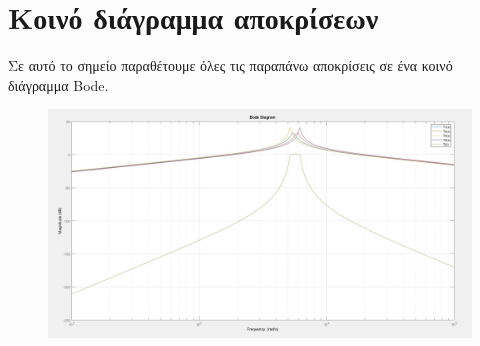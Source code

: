 \documentclass{article}
\begin{document}
{{\section*{Κοινό διάγραμμα αποκρίσεων} 
Σε αυτό το σημείο παραθέτουμε όλες τις παραπάνω αποκρίσεις σε ένα κοινό διάγραμμα Bode.
\begin{figure}[h!]
\centering
 	\advance\leftskip-4cm
  \includegraphics[width=200mm,scale=2]{thema2/matlab5.jpg}
\end{figure}  

\newpage
}}
\end{document}
